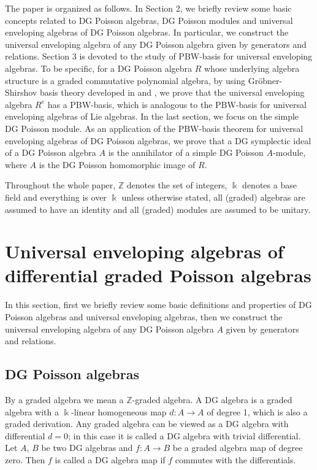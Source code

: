 \documentclass[a4paper,10pt]{amsart}
\theoremstyle{definition}
\theoremstyle{remark}
\numberwithin{equation}{section}
\begin{document}
The paper is organized as follows. In Section 2, we briefly review some basic concepts related to DG Poisson algebras, DG Poisson modules and universal enveloping algebras of DG Poisson algebras. In particular, we construct the universal enveloping algebra of any DG Poisson algebra given by generators and relations. Section 3 is devoted to the study of PBW-basis for universal enveloping algebras. To be specific, for a DG Poisson algebra $R$ whose underlying algebra structure is a graded commutative polynomial algebra, by using Gr\"{o}bner-Shirshov basis theory developed in \cite{KL} and \cite{KLe}, we prove that the universal enveloping algebra $R^e$ has a PBW-basis, which is analogous to the PBW-basis for universal enveloping algebras of Lie algebras. In the last section, we focus on the simple DG Poisson module. As an application of the PBW-basis theorem for universal enveloping algebras of DG Poisson algebras, we prove that a DG symplectic ideal of a DG Poisson algebra $A$ is the annihilator of a simple DG Poisson $A$-module, where $A$ is the DG Poisson homomorphic image of $R$.

Throughout the whole paper, $\mathbb{Z}$ denotes the set of
integers, $\Bbbk$ denotes a base field and everything is over
$\Bbbk$ unless otherwise stated, all (graded) algebras are assumed
to have an identity and all (graded) modules are assumed to be
unitary.

\medskip
\section{Universal enveloping algebras of differential graded Poisson algebras}
In this section, first we briefly review some basic definitions and
properties of DG Poisson algebras and universal enveloping algebras, then we construct the universal
enveloping algebra of any DG Poisson algebra $A$ given by generators
and relations.

\subsection{DG Poisson algebras} By a graded algebra we mean
a $\mathbb{Z}$-graded algebra. A DG algebra is a graded algebra with
a $\Bbbk$-linear homogeneous map $d: A\rightarrow A$ of degree 1,
which is also a graded derivation. Any graded algebra can be viewed
as a DG algebra with differential $d=0$; in this case it is called a
DG algebra with trivial differential. Let $A$, $B$ be two DG
algebras and $f: A\rightarrow B$ be a graded algebra map of degree
zero. Then $f$ is called a DG algebra map if $f$ commutes with the
differentials.
\end{document}
